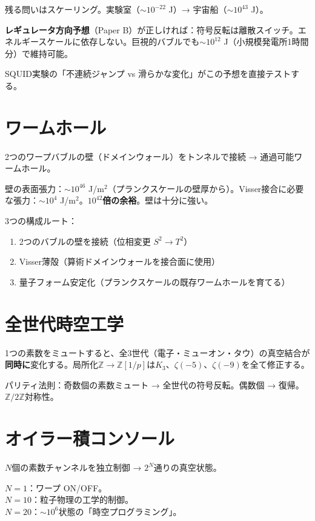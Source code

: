 \documentclass[12pt,a4paper]{article}
\newcommand{\Zp}{\mathbb{Z}[1/p]}
\begin{document}
残る問いはスケーリング。実験室（$\sim 10^{-22}$ J）→ 宇宙船（$\sim 10^{43}$ J）。

\textbf{レギュレータ方向予想}（Paper B）が正しければ：符号反転は離散スイッチ。エネルギースケールに依存しない。巨視的バブルでも$\sim 10^{12}$ J（小規模発電所1時間分）で維持可能。

SQUID実験の「不連続ジャンプ vs 滑らかな変化」がこの予想を直接テストする。

\section{ワームホール}

2つのワープバブルの壁（ドメインウォール）をトンネルで接続 → 通過可能ワームホール。

壁の表面張力：$\sim 10^{46}$ J/m$^2$（プランクスケールの壁厚から）。Visser接合に必要な張力：$\sim 10^4$ J/m$^2$。\textbf{$10^{42}$倍の余裕}。壁は十分に強い。

3つの構成ルート：
\begin{enumerate}
\item 2つのバブルの壁を接続（位相変更 $S^2 \to T^2$）
\item Visser薄殻（算術ドメインウォールを接合面に使用）
\item 量子フォーム安定化（プランクスケールの既存ワームホールを育てる）
\end{enumerate}

\section{全世代時空工学}

1つの素数をミュートすると、全3世代（電子・ミューオン・タウ）の真空結合が\textbf{同時に}変化する。局所化$\mathbb{Z} \to \Zp$は$K_3$、$\zeta(-5)$、$\zeta(-9)$を全て修正する。

パリティ法則：奇数個の素数ミュート → 全世代の符号反転。偶数個 → 復帰。$\mathbb{Z}/2\mathbb{Z}$対称性。

\section{オイラー積コンソール}

$N$個の素数チャンネルを独立制御 → $2^N$通りの真空状態。

$N = 1$：ワープ ON/OFF。\\
$N = 10$：粒子物理の工学的制御。\\
$N = 20$：$\sim 10^6$状態の「時空プログラミング」。
\end{document}
